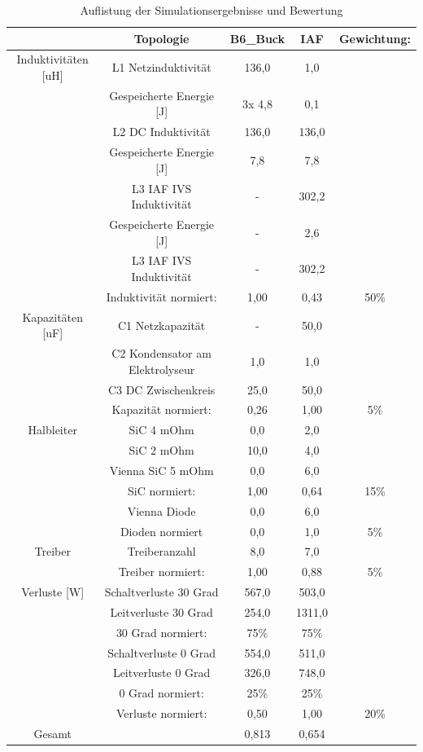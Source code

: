 \begin{table}
\begin{tabular}{|c|c|c|c|c|}
	\hline
	& Topologie & B6\_Buck & IAF & Gewichtung: \\
	\hline
	Induktivitäten [uH] & L1 Netzinduktivität & 136,0 & 1,0 &  \\
	\hline
	 & Gespeicherte Energie [J] & 3x 4,8 & 0,1 & \\  %
	\hline
	& L2 DC Induktivität & 136,0 & 136,0 &  \\
	\hline
	& Gespeicherte Energie [J] & 7,8 & 7,8 &  \\
	\hline
	& L3 IAF IVS Induktivität & - & 302,2 &  \\
	\hline
	& Gespeicherte Energie [J] & - & 2,6 & \\
	\hline
	& L3 IAF IVS Induktivität & - & 302,2 &  \\
	\hline
	& Induktivität normiert: & 1,00 & 0,43 & 50\% \\
	\hline
	Kapazitäten [uF] & C1 Netzkapazität & - & 50,0 &  \\
	\hline
	& C2 Kondensator am Elektrolyseur & 1,0 & 1,0 &  \\
	\hline
	& C3 DC Zwischenkreis & 25,0 & 50,0 &  \\
	\hline
	& Kapazität normiert: & 0,26 & 1,00 & 5\% \\
	\hline
	Halbleiter & SiC 4 mOhm & 0,0 & 2,0 &  \\
	\hline
	& SiC 2 mOhm & 10,0 & 4,0 &  \\
	\hline
	& Vienna SiC 5 mOhm & 0,0 & 6,0 &  \\
	\hline
	& SiC normiert: & 1,00 & 0,64 & 15\% \\
	\hline
	& Vienna Diode & 0,0 & 6,0 &  \\
	\hline
	& Dioden normiert & 0,0 & 1,0 & 5\% \\
	\hline
	Treiber & Treiberanzahl & 8,0 & 7,0 &  \\
	\hline
	& Treiber normiert: & 1,00 & 0,88 & 5\% \\
	\hline
	Verluste [W] & Schaltverluste 30 Grad & 567,0 & 503,0 &  \\
	\hline
	& Leitverluste 30 Grad & 254,0 & 1311,0 &  \\
	\hline
	& 30 Grad normiert: & 75\% & 75\% &  \\
	\hline
	& Schaltverluste 0 Grad & 554,0 & 511,0 &  \\
	\hline
	& Leitverluste 0 Grad & 326,0 & 748,0 &  \\
	\hline
	& 0 Grad normiert: & 25\% & 25\% &  \\
	\hline
	& Verluste normiert: & 0,50 & 1,00 & 20\% \\
	\hline
	Gesamt &  &  0,813 & 0,654 & \\
	\hline
\end{tabular}
\caption{Auflistung der Simulationsergebnisse und Bewertung}
\label{tab:Auswertung}
\end{table}


